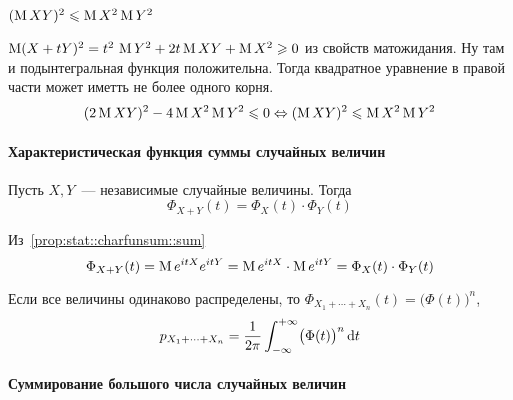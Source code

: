 \documentclass[12pt,timbord]{../../../notes}
\begin{document}
\begin{prop}\label{prop:stat::shwartz}
  $(\operatorname{\mathrm M}  XY)^2 \leqslant \operatorname{\mathrm M} X^2 \operatorname{\mathrm M} Y^2$
\end{prop}
\begin{itlproof}
  $\operatorname{\mathrm M} (X+ tY)^2 = t^2\,\operatorname{\mathrm M} Y^2 + 2 t \operatorname{\mathrm M} XY + \operatorname{\mathrm M} X^2 \geqslant 0$ из свойств матожидания. Ну
  там и подынтегральная функция положительна. Тогда квадратное уравнение в правой части может
  иметть не более одного корня.
  \[
    (2 \operatorname{\mathrm M} XY)^2 - 4 \operatorname{\mathrm M} X^2 \operatorname{\mathrm M} Y^2 \leqslant 0 \Leftrightarrow 
    (\operatorname{\mathrm M}  XY)^2 \leqslant \operatorname{\mathrm M} X^2 \operatorname{\mathrm M} Y^2
  \]
\end{itlproof}

\paragraph{Характеристическая функция суммы случайных величин}
\label{par:stat::charfunsum}

\begin{prop}\label{prop:stat::charfunsum}
  Пусть $X,Y$~--- независимые случайные величины. Тогда 
  \[
    \Phi_{X+Y}(t) = \Phi_X(t) \cdot \Phi_Y(t)
  \]
\end{prop}
\begin{itlproof}
  Из~\ref{prop:stat::charfunsum::sum}  
  \[
    \Phi_{X+Y}(t) = \operatorname{\mathrm M} e^{itX} e^{itY} = \operatorname{\mathrm M} e^{itX} \cdot \operatorname{\mathrm M} e^{itY} = \Phi_{X}(t) \cdot
    \Phi_Y (t)
  \]
\end{itlproof}
\begin{cor}\label{conj:stat::charfunsum::sumn}
  Если все величины одинаково распределены, то $\Phi_{X_1 + \dotsb + X_n}(t) =
  \bigl(\Phi(t)\bigr)^n$, \[
    p_{X_1 + \dotsb + X_n} = \frac{1}{2\pi} \int_{-\infty}^{+\infty} \bigl(\Phi(t)\bigr)^n \, \mathrm{d} t 
  \]
\end{cor}

\paragraph{Суммирование большого числа случайных величин}
\label{par:stat::randlimsum}
\flame\underdev\sour
\end{document}
